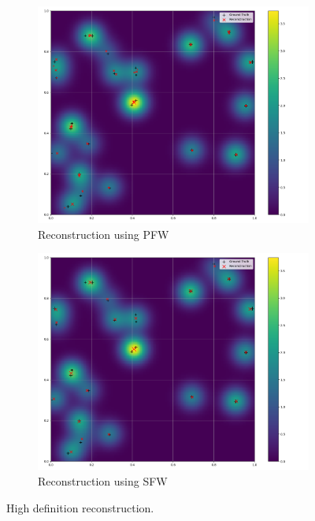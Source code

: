 \documentclass[a4paper,12pt,oneside]{report}
\theoremstyle{named}
\begin{document}
\begin{figure}
\centering
\begin{subfigure}[b]{1\textwidth}
   \hspace*{1cm}\includegraphics[width=0.8\linewidth]{pfw_2d_2.png}
   \caption{Reconstruction using PFW}
   \label{fig:pfw_2d2} 
\end{subfigure}

\begin{subfigure}[b]{1\textwidth}
   \hspace*{1cm}\includegraphics[width=0.8\linewidth]{sfw_2d_2.png}
   \caption{Reconstruction using SFW}
   \label{fig:sfw_2d2}
\end{subfigure}

\caption{High definition reconstruction.}
\label{fig:PFWvsSFW_2d2}
\end{figure}

\newpage
\end{document}

